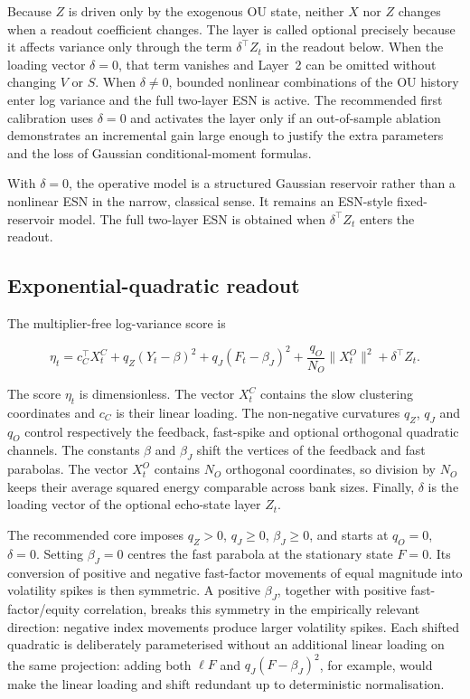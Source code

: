 \documentclass[11pt,a4paper]{article}
\begin{document}
Because \(Z\) is driven only by the exogenous OU state, neither \(X\) nor \(Z\) changes when a
readout coefficient changes. The layer is called optional precisely because it affects variance
only through the term \(\delta^\top Z_t\) in the readout below. When the loading vector
\(\delta=0\), that term vanishes and Layer~2 can be omitted without changing \(V\) or \(S\).
When \(\delta\neq0\), bounded nonlinear combinations of the OU history enter log variance and
the full two-layer ESN is active. The recommended first calibration uses \(\delta=0\) and
activates the layer only if an out-of-sample ablation demonstrates an incremental gain large
enough to justify the extra parameters and the loss of Gaussian conditional-moment formulas.

\begin{warningbox}[Terminology]
With \(\delta=0\), the operative model is a structured Gaussian reservoir rather than a
nonlinear ESN in the narrow, classical sense. It remains an ESN-style fixed-reservoir model.
The full two-layer ESN is obtained when \(\delta^\top Z_t\) enters the readout.
\end{warningbox}

\subsection{Exponential-quadratic readout}

The multiplier-free log-variance score is

\begin{equation}
\boxed{
\eta_t
=c_C^\top X_t^C
+q_Z(Y_t-\beta)^2
+q_J(F_t-\beta_J)^2
+\frac{q_O}{N_O}\lVert X_t^O\rVert^2
+\delta^\top Z_t .}
\label{eq:eta}
\end{equation}

The score \(\eta_t\) is dimensionless. The vector \(X_t^C\) contains the slow clustering
coordinates and \(c_C\) is their linear loading. The non-negative curvatures \(q_Z\), \(q_J\)
and \(q_O\) control respectively the feedback, fast-spike and optional orthogonal quadratic
channels. The constants \(\beta\) and \(\beta_J\) shift the vertices of the feedback and fast
parabolas. The vector \(X_t^O\) contains \(N_O\) orthogonal coordinates, so division by \(N_O\)
keeps their average squared energy comparable across bank sizes. Finally, \(\delta\) is the
loading vector of the optional echo-state layer \(Z_t\).

The recommended core imposes \(q_Z>0\), \(q_J\geq0\), \(\beta_J\geq0\), and starts at
\(q_O=0\), \(\delta=0\). Setting \(\beta_J=0\) centres the fast parabola at the stationary
state \(F=0\). Its conversion of positive and negative fast-factor movements of equal magnitude
into volatility spikes is then symmetric. A positive \(\beta_J\), together with positive
fast-factor/equity correlation, breaks this symmetry in the empirically relevant direction:
negative index movements produce larger volatility spikes. Each shifted quadratic is
deliberately parameterised without an additional linear
loading on the same projection: adding both \(\ell F\) and \(q_J(F-\beta_J)^2\), for example,
would make the linear loading and shift redundant up to deterministic normalisation.
\end{document}
